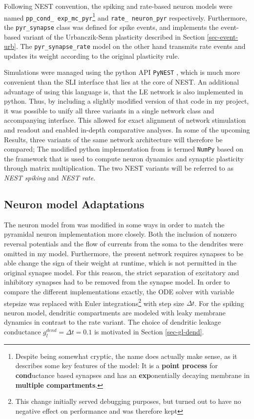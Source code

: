 Following NEST convention, the spiking and rate-based neuron models were named \texttt{pp\_\allowbreak cond\_\allowbreak
exp\_\allowbreak mc\_\allowbreak pyr}\footnote{Despite being somewhat cryptic, the name does actually make sense, as it
describes some key features of the model: It is a \textbf{point process} for \textbf{cond}uctance based synapses and has
an \textbf{exp}onentially decaying membrane in \textbf{multiple compartments}.} and \texttt{rate\_\allowbreak
neuron\_\allowbreak pyr} respectively. Furthermore, the \texttt{pyr\_\allowbreak synapse} class was defined for spike
events, and implements the event-based variant of the Urbanczik-Senn plasticity described in Section
\ref{sec-event-urb}. The \texttt{pyr\_\allowbreak synapse\_\allowbreak rate} model on the other hand transmits rate
events and updates its weight according to the original plasticity rule.

Simulations were managed using the python API \texttt{PyNEST} \citep{Eppler2009}, which is much more convenient than the
SLI interface that lies at the core of NEST. An additional advantage of using this language is, that the LE network  is
also implemented in python. Thus, by including a slightly modified version of that code in my project, it was possible
to unify all three variants in a single network class and accompanying interface. This allowed for exact alignment of
network stimulation and readout and enabled in-depth comparative analyses. In some of the upcoming Results, three
variants of the same network architecture will therefore be compared; The modified python implementation from
\citep{Haider2021} is termed \texttt{NumPy} based on the framework that is used to compute neuron dynamics and synaptic
plasticity through matrix multiplication. The two NEST variants will be referred to as \textit{NEST spiking} and
\textit{NEST rate}. 

\subsection{Neuron model Adaptations}

The neuron model from \cite{Stapmanns2021} was modified in some ways in order to match the pyramidal neuron
implementation more closely. Both the inclusion of nonzero reversal potentials and the flow of currents from the soma to
the dendrites were omitted in my model. Furthermore, the present network requires synapses to be able
change the sign of their weight at runtime, which is not permitted in the original synapse model. For this reason, the
strict separation of excitatory and inhibitory synapses had to be removed from the synapse model. In order to compare
the different implementations exactly, the ODE solver with variable stepsize was replaced with Euler
integrations\footnote{This change initially served debugging purposes, but turned out to have no negative effect on
performance and was therefore kept} with step size $\Delta t$. For the spiking neuron model, dendritic compartments are
modeled with leaky membrane dynamics in contrast to the rate variant. The choice of dendritic leakage conductance
$g_l^{dend}=\Delta t=0.1$ is motivated in Section \ref{sec-gl-dend}.

